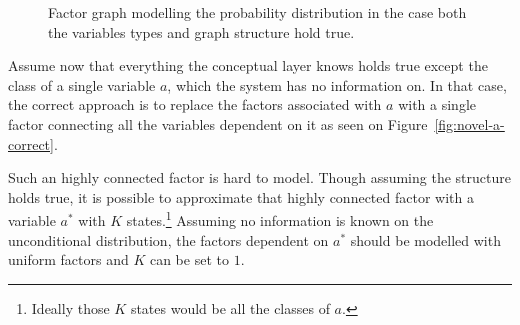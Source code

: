 \begin{figure}[h]
\centering
{}

\caption{Factor graph modelling the probability distribution in the case both
          the variables types and graph structure hold true.}
\end{figure}


Assume now that everything the conceptual layer knows holds true except the
class of a single variable $a$, which the system has no information on. 
In that case, the correct approach is to replace the factors associated with
$a$ with a single factor connecting all the variables dependent on it as seen
on Figure~\ref{fig:novel-a-correct}.

Such an highly connected factor is hard to model. Though assuming the structure
holds true, it is possible to approximate that highly connected factor with a
variable $a^*$ with $K$ states.\footnote{Ideally those $K$ states would be all
the classes of $a$.}
Assuming no information is known on the unconditional distribution, the factors
dependent on $a^*$ should be modelled with uniform factors and $K$ can be set to
$1$.


